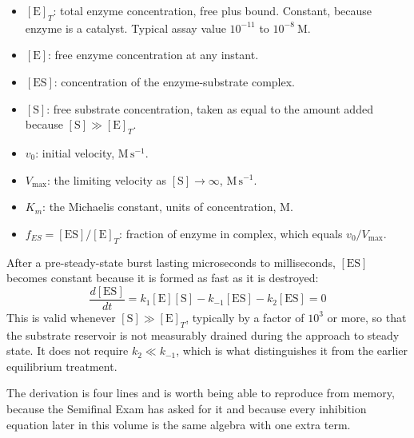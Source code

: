 \begin{defbox}[title={DEFINITIONS: every symbol in the derivation}]
\begin{itemize}
\item $[\mathrm{E}]_T$: total enzyme concentration, free plus bound. Constant, because
enzyme is a catalyst. Typical assay value $10^{-11}$ to $10^{-8}\ \mathrm{M}$.
\item $[\mathrm{E}]$: free enzyme concentration at any instant.
\item $[\mathrm{ES}]$: concentration of the enzyme-substrate complex.
\item $[\mathrm{S}]$: free substrate concentration, taken as equal to the amount added
because $[\mathrm{S}]\gg[\mathrm{E}]_T$.
\item $v_0$: initial velocity, $\mathrm{M\,s^{-1}}$.
\item $V_{\max}$: the limiting velocity as $[\mathrm{S}]\rightarrow\infty$,
$\mathrm{M\,s^{-1}}$.
\item $K_m$: the Michaelis constant, units of concentration, $\mathrm{M}$.
\item $f_{ES}=[\mathrm{ES}]/[\mathrm{E}]_T$: fraction of enzyme in complex, which
equals $v_0/V_{\max}$.
\end{itemize}
\end{defbox}

\begin{thmbox}[title={PRINCIPLE: the steady state assumption}]
After a pre-steady-state burst lasting microseconds to milliseconds, $[\mathrm{ES}]$
becomes constant because it is formed as fast as it is destroyed:
\[
\frac{d[\mathrm{ES}]}{dt}=k_1[\mathrm{E}][\mathrm{S}]-k_{-1}[\mathrm{ES}]-k_2[\mathrm{ES}]=0
\]
This is valid whenever $[\mathrm{S}]\gg[\mathrm{E}]_T$, typically by a factor of
$10^{3}$ or more, so that the substrate reservoir is not measurably drained during the
approach to steady state. It does not require $k_2\ll k_{-1}$, which is what
distinguishes it from the earlier equilibrium treatment.
\end{thmbox}

The derivation is four lines and is worth being able to reproduce from memory, because
the Semifinal Exam has asked for it and because every inhibition equation later in this
volume is the same algebra with one extra term.

